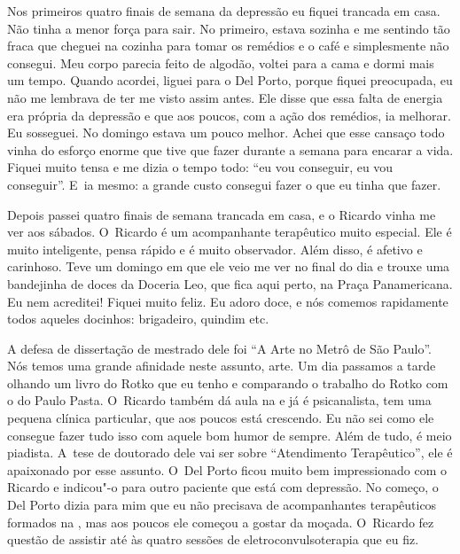 Nos primeiros quatro finais de semana da depressão eu fiquei trancada
em casa. Não tinha a menor força para sair. No primeiro, estava sozinha
e me sentindo tão fraca que cheguei na cozinha para tomar os remédios e
o café e simplesmente não consegui. Meu corpo parecia feito de
algodão, voltei para a cama e dormi mais um tempo. Quando acordei,
liguei para o Del Porto, porque fiquei preocupada, eu não me lembrava de
ter me visto assim antes. Ele disse que essa falta de energia era
própria da depressão e que aos poucos, com a ação dos remédios, ia
melhorar. Eu sosseguei. No domingo estava um pouco melhor. Achei que
esse cansaço todo vinha do esforço enorme que tive que fazer durante a
semana para encarar a vida. Fiquei muito tensa e me dizia o tempo todo:
``eu vou conseguir, eu vou conseguir''. E~ia mesmo: a grande custo
consegui fazer o que eu tinha que fazer.

Depois passei quatro finais de semana trancada em casa, e o Ricardo
vinha me ver aos sábados. O~Ricardo é um acompanhante terapêutico muito
especial. Ele é muito inteligente, pensa rápido e é muito observador.
Além disso, é afetivo e carinhoso. Teve um domingo em que ele veio me
ver no final do dia e trouxe uma bandejinha de doces da Doceria Leo, que
fica aqui perto, na Praça Panamericana. Eu nem acreditei! Fiquei muito
feliz. Eu adoro doce, e nós comemos rapidamente todos aqueles docinhos:
brigadeiro, quindim etc.

A defesa de dissertação de mestrado dele foi ``A Arte no Metrô de São
Paulo''. Nós temos uma grande afinidade neste assunto, arte. Um dia
passamos a tarde olhando um livro do Rotko que eu tenho e comparando o
trabalho do Rotko com o do Paulo Pasta. O~Ricardo também dá aula na 
e já é psicanalista, tem uma pequena clínica particular, que aos poucos
está crescendo. Eu não sei como ele consegue fazer tudo isso com aquele
bom humor de sempre. Além de tudo, é meio piadista. A~tese de doutorado
dele vai ser sobre ``Atendimento Terapêutico'', ele é apaixonado por
esse assunto. O~Del Porto ficou muito bem impressionado com o Ricardo e
indicou"-o para outro paciente que está com depressão. No começo, o Del
Porto dizia para mim que eu não precisava de acompanhantes terapêuticos
formados na , mas aos poucos ele começou a gostar da moçada. 
O~Ricardo fez questão de assistir até às quatro sessões de
eletroconvulsoterapia que eu fiz.

